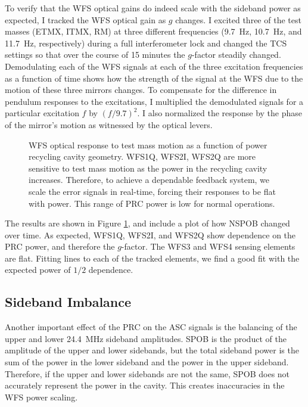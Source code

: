 To verify that the WFS optical gains do indeed scale with the sideband
power as expected, I tracked the WFS optical gain as $g$ changes. I
excited three of the test masses (ETMX, ITMX, RM) at three different
frequencies (9.7~Hz, 10.7~Hz, and 11.7~Hz, respectively) during a full
interferometer lock and changed the TCS settings so that over the
course of 15 minutes the $g$-factor steadily changed. Demodulating
each of the WFS signals at each of the three excitation frequencies as
a function of time shows how the strength of the signal at the WFS due
to the motion of these three mirrors changes. To compensate for the
difference in pendulum responses to the excitations, I multiplied the
demodulated signals for a particular excitation $f$ by $(f/9.7)^2$. I
also normalized the response by the phase of the mirror's motion as
witnessed by the optical levers.

\begin{figure}
\begin{centering}
\caption[Measured dependence of the WFS error signals on the power
recycling cavity geometry]{WFS optical response to test mass motion as
  a function of power recycling cavity geometry. WFS1Q, WFS2I, WFS2Q
  are more sensitive to test mass motion as the power in the recycling
  cavity increases. Therefore, to achieve a dependable feedback
  system, we scale the error signals in real-time, forcing their
  responses to be flat with power. This range of PRC power is low for
  normal operations.}
\label{fig:WFStrack}
\end{centering}
\end{figure}

The results are shown in Figure \ref{fig:WFStrack}, and include a plot
of how NSPOB changed over time. As expected, WFS1Q, WFS2I, and WFS2Q
show dependence on the PRC power, and therefore the $g$-factor. The
WFS3 and WFS4 sensing elements are flat. Fitting lines to each of the
tracked elements, we find a good fit with the expected power of $1/2$
dependence. 



\subsection{Sideband Imbalance}
Another important effect of the PRC on the ASC signals is the
balancing of the upper and lower 24.4~MHz sideband amplitudes. SPOB is
the product of the amplitude of the upper and lower sidebands, but the
total sideband power is the sum of the power in the lower sideband and
the power in the upper sideband. Therefore, if the upper and lower
sidebands are not the same, SPOB does not accurately represent the
power in the cavity. This creates inaccuracies in the WFS power
scaling.

